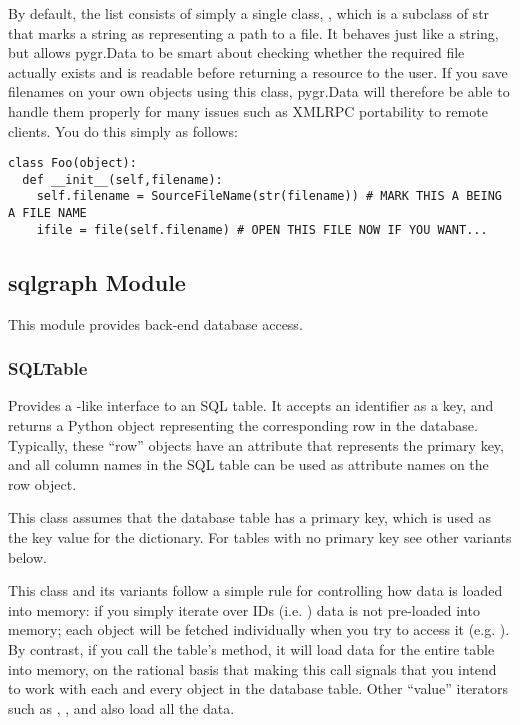 \documentclass{howto}
\begin{document}
By default, the  list consists of simply a single
class, , which is a subclass of str
that marks a string as representing a path to a file.  It behaves
just like a string, but allows pygr.Data to be smart about checking
whether the required file actually exists and is readable before returning
a resource to the user.  If you save filenames on your own objects using
this class, pygr.Data will therefore be able to handle them properly for
many issues such as XMLRPC portability to remote clients.  You do this simply
as follows:
\begin{verbatim}
class Foo(object):
  def __init__(self,filename):
    self.filename = SourceFileName(str(filename)) # MARK THIS A BEING A FILE NAME
    ifile = file(self.filename) # OPEN THIS FILE NOW IF YOU WANT...
\end{verbatim}

\subsection{sqlgraph Module}
\label{sqlgraph-module}
This module provides back-end database access.

\subsubsection{SQLTable}
Provides a -like interface to an SQL table.  It accepts
an identifier as a key, and returns a Python object representing
the corresponding row in the database.  Typically, these ``row''
objects have an  attribute that represents the
primary key, and all column names in the SQL table can be
used as attribute names on the row object.

This class assumes that the database table has a primary key,
which is used as the key value for the dictionary.  For tables
with no primary key see other variants below.

This class and its variants follow a simple rule for controlling
how data is loaded into memory: if you simply iterate over IDs
(i.e. ) data is not pre-loaded into memory;
each object will be fetched individually when you try to access it
(e.g. ).  By contrast, if you call the table's
 method, it will load data for the entire table into
memory, on the rational basis that making this call signals that you
intend to work with each and every object in the database table.  Other
``value'' iterators such as , ,
and  also load all the data.
\end{document}
